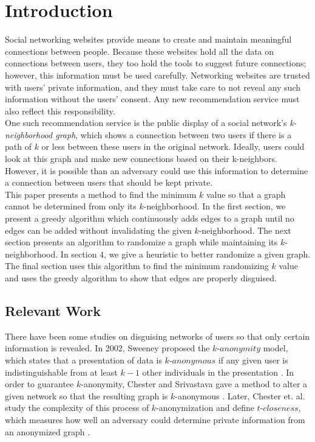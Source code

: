\section{Introduction}

\indent Social networking websites provide means to create and maintain meaningful connections between people. Because these websites hold all the data on connections between users, they too hold the tools to suggest future connections; however, this information must be used carefully. Networking websites are trusted with users' private information, and they must take care to not reveal any such information without the users' consent. Any new recommendation service must also reflect this responsibility. \\

\indent One such recommendation service is the public display of a social network's  \emph{k-neighborhood graph}, which shows a connection between two users if there is a path of $k$ or less between these users in the original network. Ideally,  users could look at this graph and make new connections based on their k-neighbors. However, it is possible than an adversary could use this information to determine a connection between users that should be kept private. \\

\indent This paper presents a method to find the minimum $k$ value so that a graph cannot be determined from only its $k$-neighborhood. In the first section, we present a greedy algorithm which continuously adds edges to a graph until no edges can be added without invalidating the given $k$-neighborhood. The next section presents an algorithm to randomize a graph while maintaining its $k$-neighborhood. In section $4$, we give a heuristic to better randomize a given graph. The final section uses this algorithm to find the minimum randomizing $k$ value and uses the greedy algorithm to show that edges are properly disguised. \\

\subsection {Relevant Work}

\indent There have been some studies on disguising networks of users so that only certain information is revealed. In 2002, Sweeney proposed the $k$-$anonymity$ model, which states that a presentation of data is $k$-$anonymous$ if any given user is indistinguishable from at least $k-1$ other individuals in the presentation \cite{Sweeney02}. In order to guarantee $k$-anonymity, Chester and Srivastava gave a method to alter a given network so that the resulting graph is $k$-anonymous \cite{Chester11}. Later, Chester et. al. study the complexity of this process of $k$-anonymization and define $t$-$closeness$, which measures how well an adversary could determine private information from an anonymized graph \cite{Chester13}. \\

